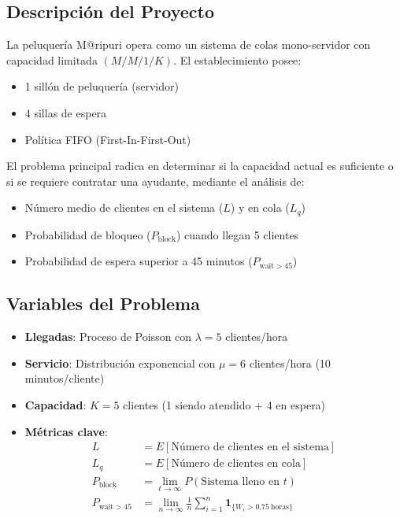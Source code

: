 \documentclass{article}
\begin{document}
\subsection{Descripción del Proyecto}
La peluquería M@ripuri opera como un sistema de colas mono-servidor con capacidad limitada $(M/M/1/K)$. El establecimiento posee:
\begin{itemize}
    \item 1 sillón de peluquería (servidor)
    \item 4 sillas de espera
    \item Política FIFO (First-In-First-Out)
\end{itemize}

El problema principal radica en determinar si la capacidad actual es suficiente o si se requiere contratar una ayudante, mediante el análisis de:
\begin{itemize}
    \item Número medio de clientes en el sistema ($L$) y en cola ($L_q$)
    \item Probabilidad de bloqueo ($P_{\text{block}}$) cuando llegan 5 clientes
    \item Probabilidad de espera superior a 45 minutos ($P_{\text{wait}>45}$)
\end{itemize}

\subsection{Variables del Problema}
\begin{itemize}
    \item \textbf{Llegadas}: Proceso de Poisson con $\lambda = 5$ clientes/hora
    \item \textbf{Servicio}: Distribución exponencial con $\mu = 6$ clientes/hora (10 minutos/cliente)
    \item \textbf{Capacidad}: $K = 5$ clientes (1 siendo atendido + 4 en espera)
    \item \textbf{Métricas clave}:
    \begin{align*}
        L &= E[\text{Número de clientes en el sistema}] \\
        L_q &= E[\text{Número de clientes en cola}] \\
        P_{\text{block}} &= \lim_{t\to\infty} P(\text{Sistema lleno en } t) \\
        P_{\text{wait}>45} &= \lim_{n\to\infty} \frac{1}{n}\sum_{i=1}^n \mathbf{1}_{\{W_i > 0.75\ \text{horas}\}}
    \end{align*}
\end{itemize}
\end{document}
